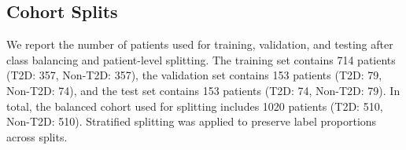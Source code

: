 
\subsection{Cohort Splits}
We report the number of patients used for training, validation, and testing after class balancing and patient-level splitting. The training set contains 714 patients (T2D: 357, Non-T2D: 357), the validation set contains 153 patients (T2D: 79, Non-T2D: 74), and the test set contains 153 patients (T2D: 74, Non-T2D: 79). In total, the balanced cohort used for splitting includes 1020 patients (T2D: 510, Non-T2D: 510). Stratified splitting was applied to preserve label proportions across splits.
